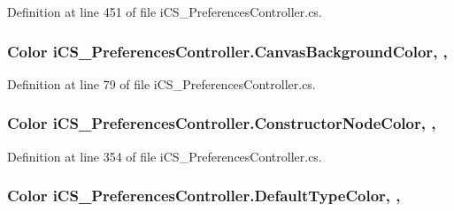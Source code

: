 Definition at line 451 of file i\+C\+S\+\_\+\+Preferences\+Controller.\+cs.

\hypertarget{classi_c_s___preferences_controller_ac3efcc0eb01719b770bfae84bfad6d21}{
\subsubsection[{Canvas\+Background\+Color}]{\setlength{\rightskip}{0pt plus 5cm}Color i\+C\+S\+\_\+\+Preferences\+Controller.\+Canvas\+Background\+Color\hspace{0.3cm}{\ttfamily [static]}, {\ttfamily [get]}, {\ttfamily [set]}}}\label{classi_c_s___preferences_controller_ac3efcc0eb01719b770bfae84bfad6d21}


Definition at line 79 of file i\+C\+S\+\_\+\+Preferences\+Controller.\+cs.

\hypertarget{classi_c_s___preferences_controller_aa88336171dd325ac7feeb82072c7b9e9}{
\subsubsection[{Constructor\+Node\+Color}]{\setlength{\rightskip}{0pt plus 5cm}Color i\+C\+S\+\_\+\+Preferences\+Controller.\+Constructor\+Node\+Color\hspace{0.3cm}{\ttfamily [static]}, {\ttfamily [get]}, {\ttfamily [set]}}}\label{classi_c_s___preferences_controller_aa88336171dd325ac7feeb82072c7b9e9}


Definition at line 354 of file i\+C\+S\+\_\+\+Preferences\+Controller.\+cs.

\hypertarget{classi_c_s___preferences_controller_ac0646c9ee8cbf418e19f52a0ab1f65fb}{
\subsubsection[{Default\+Type\+Color}]{\setlength{\rightskip}{0pt plus 5cm}Color i\+C\+S\+\_\+\+Preferences\+Controller.\+Default\+Type\+Color\hspace{0.3cm}{\ttfamily [static]}, {\ttfamily [get]}, {\ttfamily [set]}}}\label{classi_c_s___preferences_controller_ac0646c9ee8cbf418e19f52a0ab1f65fb}


